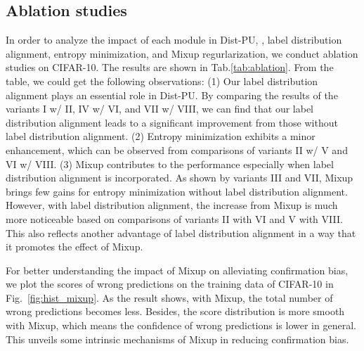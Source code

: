 \documentclass[final]{cvpr}
\newcommand{\bangyan}[1]{#1}
\newcommand{\yunrui}[1]{#1}
\begin{document}
\subsection{Ablation studies}
In order to analyze the impact of \bangyan{each module in Dist-PU, \ie,} label distribution alignment, entropy minimization, and Mixup regurlarization, we conduct ablation studies on CIFAR-10. The results are shown in Tab.\ref{tab:ablation}. \yunrui{From the table, we could get the following observations: (1) Our label distribution alignment plays an essential role in Dist-PU. By comparing the results of the variants I w/ II, IV w/ VI, and VII w/ VIII, we can find that our label distribution alignment leads to a significant improvement from those without label distribution alignment. (2) Entropy minimization exhibits a minor enhancement, which can be observed from comparisons of variants II w/ V and VI w/ VIII. (3) Mixup contributes to the performance especially when label distribution alignment is incorporated. As shown by variants III and VII, Mixup brings few gains for entropy minimization without label distribution alignment. However, with label distribution alignment, the increase from Mixup is much more noticeable based on comparisons of variants II with VI and V with VIII. This also reflects another advantage of label distribution alignment in a way that it promotes the effect of Mixup.}

For better understanding the \bangyan{impact} of Mixup on alleviating confirmation bias, we plot the scores of wrong predictions on the training data of CIFAR-10 in Fig.~\ref{fig:hist_mixup}. As the result shows, with Mixup, the total number of wrong predictions becomes less. Besides, the score distribution is more smooth with Mixup, which means the confidence of wrong predictions is lower in general. This unveils some intrinsic mechanisms of Mixup in reducing confirmation bias.

\end{document}
